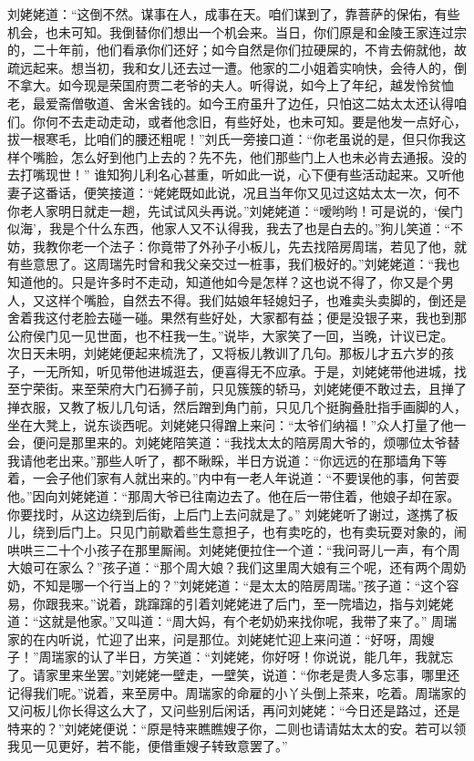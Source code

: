 \documentclass[12pt,oneside]{book}
\begin{document}
刘姥姥道：“这倒不然。谋事在人，成事在天。咱们谋到了，靠菩萨的保佑，有些机会，也未可知。我倒替你们想出一个机会来。当日，你们原是和金陵王家连过宗的，二十年前，他们看承你们还好；如今自然是你们拉硬屎的，不肯去俯就他，故疏远起来。想当初，我和女儿还去过一遭。他家的二小姐着实响快，会待人的，倒不拿大。如今现是荣国府贾二老爷的夫人。听得说，如今上了年纪，越发怜贫恤老，最爱斋僧敬道、舍米舍钱的。如今王府虽升了边任，只怕这二姑太太还认得咱们。你何不去走动走动，或者他念旧，有些好处，也未可知。要是他发一点好心，拔一根寒毛，比咱们的腰还粗呢！”刘氏一旁接口道：“你老虽说的是，但只你我这样个嘴脸，怎么好到他门上去的？先不先，他们那些门上人也未必肯去通报。没的去打嘴现世！”
谁知狗儿利名心甚重，听如此一说，心下便有些活动起来。又听他妻子这番话，便笑接道：“姥姥既如此说，况且当年你又见过这姑太太一次，何不你老人家明日就走一趟，先试试风头再说。”刘姥姥道：“嗳哟哟！可是说的，‘侯门似海’，我是个什么东西，他家人又不认得我，我去了也是白去的。”狗儿笑道：“不妨，我教你老一个法子：你竟带了外孙子小板儿，先去找陪房周瑞，若见了他，就有些意思了。这周瑞先时曾和我父亲交过一桩事，我们极好的。”刘姥姥道：“我也知道他的。只是许多时不走动，知道他如今是怎样？这也说不得了，你又是个男人，又这样个嘴脸，自然去不得。我们姑娘年轻媳妇子，也难卖头卖脚的，倒还是舍着我这付老脸去碰一碰。果然有些好处，大家都有益；便是没银子来，我也到那公府侯门见一见世面，也不枉我一生。”说毕，大家笑了一回，当晚，计议已定。
次日天未明，刘姥姥便起来梳洗了，又将板儿教训了几句。那板儿才五六岁的孩子，一无所知，听见带他进城逛去，便喜得无不应承。于是，刘姥姥带他进城，找至宁荣街。来至荣府大门石狮子前，只见簇簇的轿马，刘姥姥便不敢过去，且掸了掸衣服，又教了板儿几句话，然后蹭到角门前，只见几个挺胸叠肚指手画脚的人，坐在大凳上，说东谈西呢。刘姥姥只得蹭上来问：“太爷们纳福！”众人打量了他一会，便问是那里来的。刘姥姥陪笑道：“我找太太的陪房周大爷的，烦哪位太爷替我请他老出来。”那些人听了，都不瞅睬，半日方说道：“你远远的在那墙角下等着，一会子他们家有人就出来的。”内中有一老人年说道：“不要误他的事，何苦耍他。”因向刘姥姥道：“那周大爷已往南边去了。他在后一带住着，他娘子却在家。你要找时，从这边绕到后街，上后门上去问就是了。”
刘姥姥听了谢过，遂携了板儿，绕到后门上。只见门前歇着些生意担子，也有卖吃的，也有卖玩耍对象的，闹哄哄三二十个小孩子在那里厮闹。刘姥姥便拉住一个道：“我问哥儿一声，有个周大娘可在家么？”孩子道：“那个周大娘？我们这里周大娘有三个呢，还有两个周奶奶，不知是哪一个行当上的？”刘姥姥道：“是太太的陪房周瑞。”孩子道：“这个容易，你跟我来。”说着，跳蹿蹿的引着刘姥姥进了后门，至一院墙边，指与刘姥姥道：“这就是他家。”又叫道：“周大妈，有个老奶奶来找你呢，我带了来了。”
周瑞家的在内听说，忙迎了出来，问是那位。刘姥姥忙迎上来问道：“好呀，周嫂子！”周瑞家的认了半日，方笑道：“刘姥姥，你好呀！你说说，能几年，我就忘了。请家里来坐罢。”刘姥姥一壁走，一壁笑，说道：“你老是贵人多忘事，哪里还记得我们呢。”说着，来至房中。周瑞家的命雇的小丫头倒上茶来，吃着。周瑞家的又问板儿你长得这么大了，又问些别后闲话，再问刘姥姥：“今日还是路过，还是特来的？”刘姥姥便说：“原是特来瞧瞧嫂子你，二则也请请姑太太的安。若可以领我见一见更好，若不能，便借重嫂子转致意罢了。”
\end{document}
